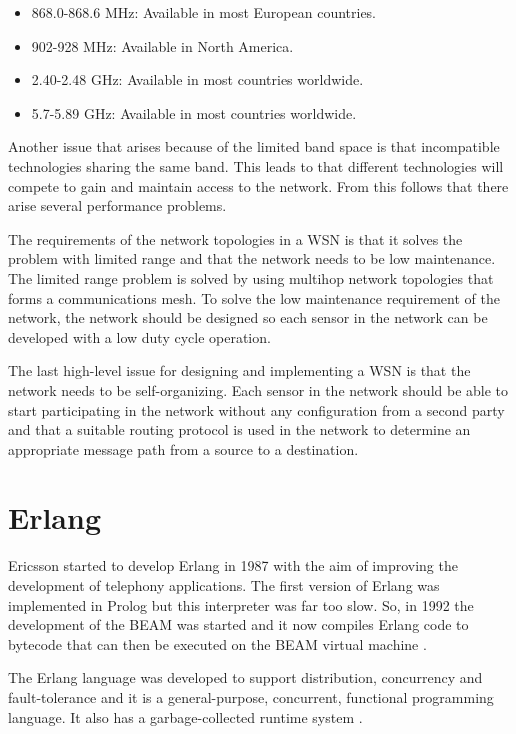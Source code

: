 \begin{itemize}
   \item 868.0-868.6 MHz: Available in most European countries.
   \item 902-928 MHz: Available in North America.
   \item 2.40-2.48 GHz: Available in most countries worldwide.
   \item 5.7-5.89 GHz: Available in most countries worldwide.
\end{itemize}

Another issue that arises because of the limited band space is that incompatible technologies sharing the same band. This leads to that different technologies will compete to gain and maintain access to the network. From this follows that there arise several performance problems.

The requirements of the network topologies in a WSN is that it solves the problem with limited range and that the network needs to be low maintenance. The limited range problem is solved by using multihop network topologies that forms a communications mesh. To solve the low maintenance requirement of the network, the network should be designed so each sensor in the network can be developed with a low duty cycle operation.

The last high-level issue for designing and implementing a WSN is that the network needs to be self-organizing. Each sensor in the network should be able to start participating in the network without any configuration from a second party and that a suitable routing protocol is used in the network to determine an appropriate message path from a source to a destination.


\section{Erlang}\label{sec:back_erlang}
Ericsson started to develop Erlang in 1987 with the aim of improving the development of telephony applications. The first version of Erlang was implemented in Prolog but this interpreter was far too slow. So, in 1992 the development of the BEAM was started and it now compiles Erlang code to bytecode that can then be executed on the BEAM virtual machine \citep{armstrong1997development}.

The Erlang language was developed to support distribution, concurrency and fault-tolerance and it is a general-purpose, concurrent, functional programming language. It also has a garbage-collected runtime system \citep{armstrong1996erlang}. 

